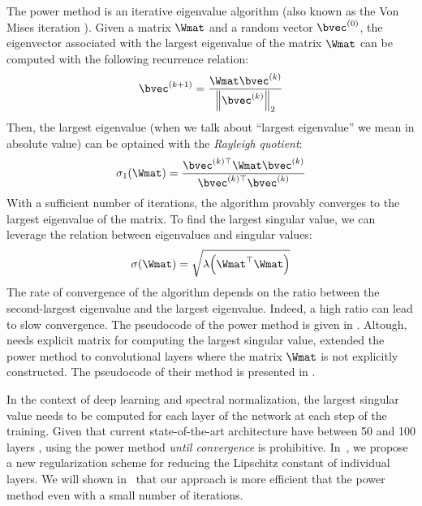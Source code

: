 
The power method is an iterative eigenvalue algorithm (also known as the Von Mises iteration \cite{mises1929praktische}).
Given a matrix $\Wmat$ and a random vector $\bvec^{(0)}$, the eigenvector associated with the largest eigenvalue of the matrix $\Wmat$ can be computed with the following recurrence relation:
\begin{equation}
  \bvec^{(k+1)} = \frac{\Wmat \bvec^{(k)}}{\norm{\bvec^{(k)}}_2}  
\end{equation}
Then, the largest eigenvalue (when we talk about ``largest eigenvalue'' we mean in absolute value) can be optained with the \emph{Rayleigh quotient}:
\begin{equation}
  \sigma_1\left( \Wmat \right) = \frac{\bvec^{(k)\top} \Wmat \bvec^{(k)}}{\bvec^{(k)\top} \bvec^{(k)}}
\end{equation}
With a sufficient number of iterations, the algorithm provably converges to the largest eigenvalue of the matrix.
To find the largest singular value, we can leverage the relation between eigenvalues and singular values:
\begin{equation}
  \sigma \left( \Wmat \right) = \sqrt{ \lambda \left( \Wmat^\top \Wmat \right) }
\end{equation}
The rate of convergence of the algorithm depends on the ratio between the second-largest eigenvalue and the largest eigenvalue.
Indeed, a high ratio can lead to slow convergence.
The pseudocode of the power method is given in .
Altough,  needs explicit matrix for computing the largest singular value, \citet{farnia2018generalizable,ryu2019plug} extended the power method to convolutional layers where the matrix $\Wmat$ is not explicitly constructed.
The pseudocode of their method is presented in . 

In the context of deep learning and spectral normalization, the largest singular value needs to be computed for each layer of the network at each step of the training. 
Given that current state-of-the-art architecture have between 50 and 100 layers \cite{he2016deep,tan2019efficientnet}, using the power method \emph{until convergence} is prohibitive.
In~, we propose a new regularization scheme for reducing the Lipschitz constant of individual layers.
We will shown in~ that our approach is more efficient that the power method even with a small number of iterations.



